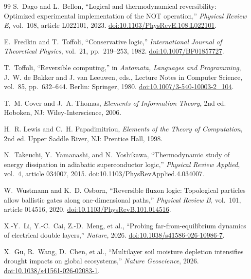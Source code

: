 \documentclass[11pt]{article}
\begin{document}
\begin{thebibliography}{99}
S.~Dago and L.~Bellon,
``Logical and thermodynamical reversibility: Optimized experimental
implementation of the NOT operation,''
\emph{Physical Review E}, vol.~108, article L022101, 2023.
\href{https://doi.org/10.1103/PhysRevE.108.L022101}
{doi:10.1103/PhysRevE.108.L022101}.

E.~Fredkin and T.~Toffoli,
``Conservative logic,''
\emph{International Journal of Theoretical Physics}, vol.~21,
pp.~219--253, 1982.
\href{https://doi.org/10.1007/BF01857727}
{doi:10.1007/BF01857727}.

T.~Toffoli,
``Reversible computing,''
in \emph{Automata, Languages and Programming},
J.~W. de Bakker and J. van Leeuwen, eds.,
Lecture Notes in Computer Science, vol.~85,
pp.~632--644.
Berlin: Springer, 1980.
\href{https://doi.org/10.1007/3-540-10003-2_104}
{doi:10.1007/3-540-10003-2\_104}.

T.~M. Cover and J.~A. Thomas,
\emph{Elements of Information Theory},
2nd ed.
Hoboken, NJ: Wiley-Interscience, 2006.

H.~R. Lewis and C.~H. Papadimitriou,
\emph{Elements of the Theory of Computation},
2nd ed.
Upper Saddle River, NJ: Prentice Hall, 1998.

N.~Takeuchi, Y.~Yamanashi, and N.~Yoshikawa,
``Thermodynamic study of energy dissipation in adiabatic
superconductor logic,''
\emph{Physical Review Applied}, vol.~4, article 034007, 2015.
\href{https://doi.org/10.1103/PhysRevApplied.4.034007}
{doi:10.1103/PhysRevApplied.4.034007}.

W.~Wustmann and K.~D. Osborn,
``Reversible fluxon logic: Topological particles allow ballistic gates
along one-dimensional paths,''
\emph{Physical Review B}, vol.~101, article 014516, 2020.
\href{https://doi.org/10.1103/PhysRevB.101.014516}
{doi:10.1103/PhysRevB.101.014516}.

X.-Y.~Li, Y.-C.~Cai, Z.-D.~Meng, et al.,
``Probing far-from-equilibrium dynamics of electrical double layers,''
\emph{Nature}, 2026.
\href{https://doi.org/10.1038/s41586-026-10986-7}
{doi:10.1038/s41586-026-10986-7}.

X.~Gu, R.~Wang, D.~Chen, et al.,
``Multilayer soil moisture depletion intensifies drought impacts on
global ecosystems,''
\emph{Nature Geoscience}, 2026.
\href{https://doi.org/10.1038/s41561-026-02083-1}
{doi:10.1038/s41561-026-02083-1}.


\end{thebibliography}
\end{document}
